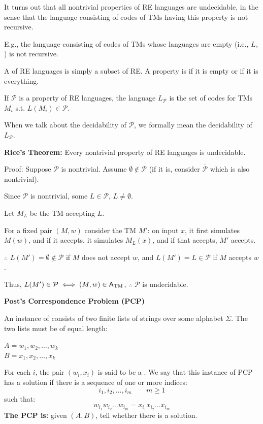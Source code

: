 \begin{frame}
It turns out that all nontrivial properties of RE languages are
undecidable, in the sense that the language consisting of codes of TMs
having this property is not recursive.

E.g., the language consisting of codes of TMs whose languages are
empty (i.e., $L_e$) is not recursive.

A  of RE languages is simply a subset of RE.  A property
is  if it is empty or if it is everything.

If $\mathcal{P}$ is a property of RE languages, the language
$L_{\mathcal{P}}$ is the set of codes for TMs $M_i$ s.t.
$L(M_i)\in\mathcal{P}$.

When we talk about the decidability of $\mathcal{P}$, we formally mean
the decidability of $L_{\mathcal{P}}$.
\end{frame}

\begin{frame}

{\bf Rice's Theorem:} Every nontrivial property of RE languages is
undecidable.

Proof: Suppose $\mathcal{P}$ is nontrivial.  Assume
$\emptyset\not\in\mathcal{P}$ (if it is, consider
$\overline{\mathcal{P}}$ which is also nontrivial).

Since $\mathcal{P}$ is nontrivial, some $L\in\mathcal{P}$,
$L\neq\emptyset$. 

Let $M_L$ be the TM accepting $L$.

For a fixed pair $(M,w)$ consider the TM $M'$: on input $x$, it first
simulates $M(w)$, and if it accepts, it simulates $M_L(x)$, and if
that accepts, $M'$ accepts.

$\therefore$ $L(M')=\emptyset\not\in\mathcal{P}$ if $M$ does not
accept $w$, and $L(M')=L\in\mathcal{P}$ if $M$ accepts $w$.

Thus, $L(M')\in\mathcal{P}\iff(M,w)\in \mathsf{A}_{\mathrm{TM}}$, $\therefore$
$\mathcal{P}$ is undecidable.
\end{frame}

\begin{frame}

{\bf Post's Correspondence Problem (PCP)}

An instance of  consists of two finite lists of strings over
some alphabet $\Sigma$.  The two lists must be of equal length:

$A=w_1,w_2,\ldots,w_k$ \\
$B=x_1,x_2,\ldots,x_k$

For each $i$, the pair $(w_i,x_i)$ is said to be a .  We say that this instance of PCP has a solution if there is a
sequence of one or more indices:
$$
i_1,i_2,\ldots,i_m\qquad m\geq 1
$$
such that:
$$
w_{i_1}w_{i_2}\ldots w_{i_m}=x_{i_1}x_{i_2}\ldots x_{i_m}
$$
{\bf The PCP is:} given $(A,B)$, tell whether there is a solution.
\end{frame}

